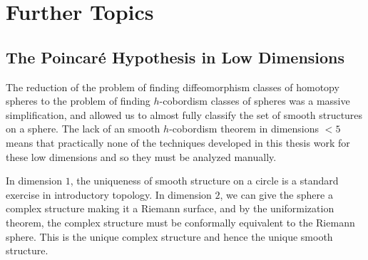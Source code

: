 \smallrule

\section{Further Topics}\label{sec:further-topics}

\subsection{The Poincar\'e Hypothesis in Low Dimensions}\label{sec:low-dimensions}

The reduction of the problem of finding diffeomorphism classes of homotopy spheres to the problem of finding $h$-cobordism classes of spheres was a massive simplification, and allowed us to almost fully classify the set of smooth structures on a sphere.
The lack of an smooth $h$-cobordism theorem in dimensions $<5$ means that practically none of the techniques developed in this thesis work for these low dimensions and so they must be analyzed manually. 

In dimension $1$, the uniqueness of smooth structure on a circle is a standard exercise in introductory topology. In dimension $2$, we can give the sphere a complex structure making it a Riemann surface, and by the uniformization theorem, the complex structure must be conformally equivalent to the Riemann sphere. This is the unique complex structure and hence the unique smooth structure.

